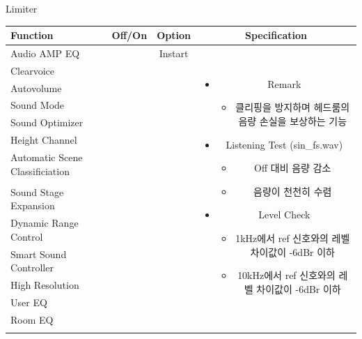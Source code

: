 \documentclass{beamer}
\begin{document}
	
	\begin{frame}[t]{Limiter}
		\begin{tiny}
			\begin{tabular}{@{}lccc@{}}
				\toprule
				Function & Off/On & Option & Specification \\
				\midrule
				Audio AMP EQ & \color{black}{Off} & Instart &
				\multirow{14}{60mm}{
					\begin{itemize}
						\item Remark
						\begin{itemize}
							\item 클리핑을 방지하며 헤드룸의 음량 손실을 보상하는 기능
						\end{itemize}
						\item Listening Test (sin\_fs.wav)
						\begin{itemize}
							\item Off 대비 음량 감소
							\item 음량이 천천히 수렴
						\end{itemize}
						\item Level Check
						\begin{itemize}
							\item 1kHz에서 ref 신호와의 레벨 차이값이 -6dBr 이하
							\item 10kHz에서 ref 신호와의 레벨 차이값이 -6dBr 이하
						\end{itemize}
					\end{itemize}
				} \\
				Clearvoice & \color{black}{Off} & & \\
				Autovolume & \color{black}{Off} & & \\
				Sound Mode & \color{black}{Off} & & \\
				Sound Optimizer & \color{black}{Off} & & \\
				Height Channel & \color{black}{Off} & & \\
				Automatic Scene Classificiation & \color{black}{Off} & & \\
				\color{blue}{Limiter} & \color{blue}{On} & & \\
				Sound Stage Expansion & \color{black}{Off} & & \\
				Dynamic Range Control & \color{black}{Off} & & \\
				Smart Sound Controller & \color{black}{Off} & & \\
				High Resolution & \color{black}{Off} & & \\
				User EQ & \color{black}{Off} & & \\
				Room EQ & \color{black}{Off} & & \\
				\color{blue}{OSD Volume} & \color{blue}{On} &  \color{blue}{Vol.40} & \\
				\midrule
			\end{tabular}
		\end{tiny}
		
	\end{frame}
	
\end{document}
